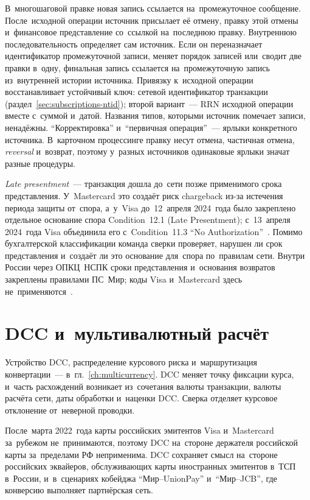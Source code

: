В~многошаговой правке новая запись ссылается на~промежуточное сообщение.
После~исходной операции источник присылает её отмену, правку этой отмены
и~финансовое представление со~ссылкой на~последнюю правку. Внутреннюю
последовательность определяет сам источник. Если он переназначает идентификатор
промежуточной записи, меняет порядок записей или~сводит две правки в~одну,
финальная запись ссылается на~промежуточную запись из~внутренней истории
источника. Привязку к~исходной операции восстанавливает устойчивый ключ:
сетевой идентификатор транзакции (раздел~\ref{sec:subscriptions-ntid});
второй вариант~--- RRN исходной операции вместе с~суммой и~датой. Названия
типов, которыми источник помечает записи, ненадёжны. \enquote{Корректировка}
и~\enquote{первичная операция}~--- ярлыки конкретного источника. В~карточном
процессинге правку несут отмена, частичная отмена, \textit{reversal} и~возврат, поэтому
у~разных источников одинаковые ярлыки значат разные процедуры.

\textit{Late presentment}~--- транзакция дошла до~сети позже применимого срока
представления. У~Mastercard это создаёт риск chargeback из-за истечения
периода защиты от~спора, а~у~Visa до~12~апреля 2024~года было закреплено
отдельное основание спора Condition~12.1 (Late Presentment); с~13~апреля
2024~года Visa объединила его с~Condition~11.3 \enquote{No
Authorization}~\cite{mc-tpr,visa-core-rules}. Помимо бухгалтерской
классификации команда сверки проверяет, нарушен ли срок представления
и~создаёт ли это основание для~спора по~правилам сети. Внутри России через
ОПКЦ~НСПК сроки представления и~основания возвратов закреплены правилами ПС~Мир;
коды Visa и~Mastercard здесь не~применяются~\cite{nspk-mir-rules}.

\section{DCC и~мультивалютный расчёт}\label{sec:recon-dcc}

Устройство DCC, распределение курсового риска и~маршрутизация конвертации~---
в~гл.~\ref{ch:multicurrency}. DCC меняет точку фиксации курса, и~часть
расхождений возникает из~сочетания валюты транзакции, валюты расчёта сети, даты
обработки и~наценки DCC. Сверка отделяет курсовое отклонение от~неверной
проводки.

После~марта 2022~года карты российских эмитентов Visa и~Mastercard за~рубежом
не~принимаются, поэтому DCC на~стороне держателя российской карты за~пределами
РФ неприменима. DCC сохраняет смысл на~стороне российских эквайеров,
обслуживающих карты иностранных эмитентов в~ТСП в~России, и~в~сценариях
кобейджа \enquote{Мир--UnionPay} и~\enquote{Мир--JCB}, где конверсию выполняет
партнёрская сеть.

